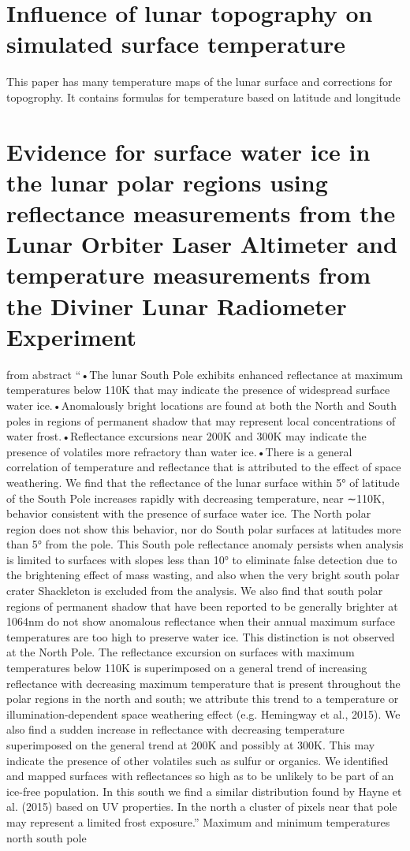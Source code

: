 \documentclass[prl,onecolumn]{revtex4-1}  %
\begin{document}
\section{Influence of lunar topography on simulated surface temperature}

This paper has many temperature maps of the lunar surface and corrections for topogrophy. It contains formulas for temperature based on latitude and longitude\citep{Zhiguo}

\section{Evidence for surface water ice in the lunar polar regions using reflectance measurements from the Lunar Orbiter Laser Altimeter and temperature measurements from the Diviner Lunar Radiometer Experiment}
from abstract ``•The lunar South Pole exhibits enhanced reflectance at maximum temperatures below 110K that may indicate the presence of widespread surface water ice.•Anomalously bright locations are found at both the North and South poles in regions of permanent shadow that may represent local concentrations of water frost.•Reflectance excursions near 200K and 300K may indicate the presence of volatiles more refractory than water ice.•There is a general correlation of temperature and reflectance that is attributed to the effect of space weathering. We find that the reflectance of the lunar surface within 5° of latitude of the South Pole increases rapidly with decreasing temperature, near ∼110K, behavior consistent with the presence of surface water ice. The North polar region does not show this behavior, nor do South polar surfaces at latitudes more than 5° from the pole. This South pole reflectance anomaly persists when analysis is limited to surfaces with slopes less than 10° to eliminate false detection due to the brightening effect of mass wasting, and also when the very bright south polar crater Shackleton is excluded from the analysis. We also find that south polar regions of permanent shadow that have been reported to be generally brighter at 1064nm do not show anomalous reflectance when their annual maximum surface temperatures are too high to preserve water ice. This distinction is not observed at the North Pole. The reflectance excursion on surfaces with maximum temperatures below 110K is superimposed on a general trend of increasing reflectance with decreasing maximum temperature that is present throughout the polar regions in the north and south; we attribute this trend to a temperature or illumination-dependent space weathering effect (e.g. Hemingway et al., 2015). We also find a sudden increase in reflectance with decreasing temperature superimposed on the general trend at 200K and possibly at 300K. This may indicate the presence of other volatiles such as sulfur or organics. We identified and mapped surfaces with reflectances so high as to be unlikely to be part of an ice-free population. In this south we find a similar distribution found by Hayne et al. (2015) based on UV properties. In the north a cluster of pixels near that pole may represent a limited frost exposure.'' Maximum and minimum temperatures north south pole
\citep{Fisher}
\end{document}
